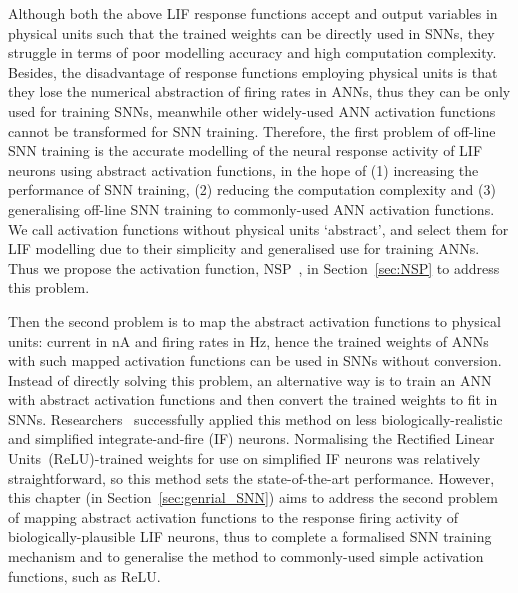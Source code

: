 	
	Although both the above LIF response functions accept and output variables in physical units such that the trained weights can be directly used in SNNs, they struggle in terms of poor modelling accuracy and high computation complexity.
	Besides, the disadvantage of response functions employing physical units is that they lose the numerical abstraction of firing rates in ANNs, thus they can be only used for training SNNs, meanwhile other widely-used ANN activation functions cannot be transformed for SNN training. 
	Therefore, the first problem of off-line SNN training is the accurate modelling of the neural response activity of LIF neurons using abstract activation functions, in the hope of (1) increasing the performance of SNN training, (2) reducing the computation complexity and (3) generalising off-line SNN training to commonly-used ANN activation functions.
	We call activation functions  without physical units `abstract', and select them for LIF modelling due to their simplicity and generalised use for training ANNs.
	Thus we propose the activation function, NSP~\cite{liu2016noisy}, in Section~\ref{sec:NSP} to address this problem.
	
	
	
	Then the second problem is to map the abstract activation functions to physical units: current in nA and firing rates in Hz, hence the trained weights of ANNs with such mapped activation functions can be used in SNNs without conversion.
	Instead of directly solving this problem, an alternative way is to train an ANN with abstract activation functions and then convert the trained weights to fit in SNNs.
	Researchers~\cite{cao2015spiking,diehl2015fast} successfully applied this method on less biologically-realistic and simplified integrate-and-fire (IF) neurons.
	Normalising the Rectified Linear Units~(ReLU)-trained weights for use on simplified IF neurons was relatively straightforward, so this method sets the state-of-the-art performance.
	However, this chapter (in Section~\ref{sec:genrial_SNN}) aims to address the second problem of mapping abstract activation functions to the response firing activity of biologically-plausible LIF neurons, thus to complete a formalised SNN training mechanism and to generalise the method to commonly-used simple activation functions, such as ReLU.
